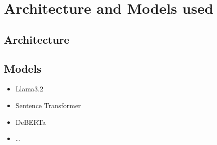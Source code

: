 \section{Architecture and Models used}
\label{sec:approach:architecture_models}

\subsection{Architecture}
\label{sec:approach:architecture_models:architecture}

\subsection{Models}
\label{sec:approach:architecture_models:models}

\begin{itemize}
  \item Llama3.2
  \item Sentence Transformer
  \item DeBERTa
  \item \ldots
\end{itemize}